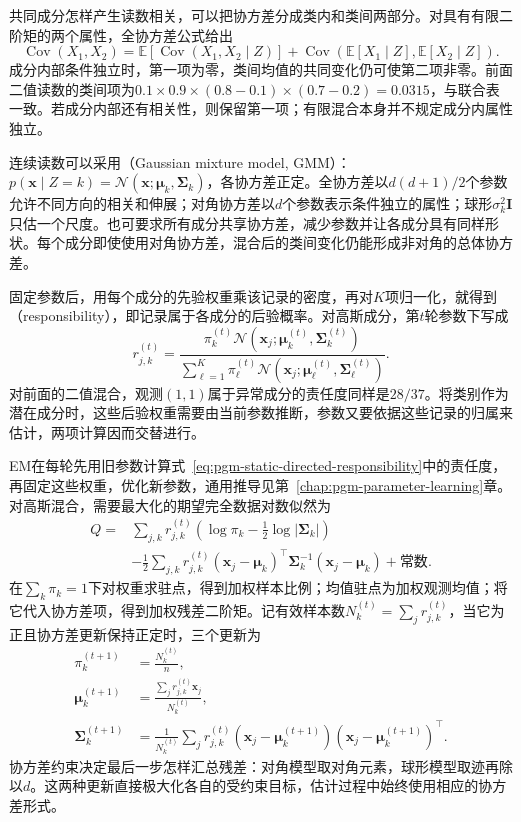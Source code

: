 共同成分怎样产生读数相关，可以把协方差分成类内和类间两部分。对具有有限二阶矩的两个属性，全协方差公式给出
\[
  \operatorname{Cov}(X_1,X_2)=
  \mathbb{E}\!\left[\operatorname{Cov}(X_1,X_2\mid Z)\right]
  +\operatorname{Cov}\!\left(
       \mathbb{E}[X_1\mid Z],\mathbb{E}[X_2\mid Z]\right).
\]
成分内部条件独立时，第一项为零，类间均值的共同变化仍可使第二项非零。前面二值读数的类间项为$0.1\times0.9\times(0.8-0.1)\times(0.7-0.2)=0.0315$，与联合表一致。若成分内部还有相关性，则保留第一项；有限混合本身并不规定成分内属性独立。

连续读数可以采用（Gaussian mixture model, GMM）：$p(\bm x\mid Z=k)=\mathcal N(\bm x;\bm\mu_k,\bm\Sigma_k)$，各协方差正定。全协方差以$d(d+1)/2$个参数允许不同方向的相关和伸展；对角协方差以$d$个参数表示条件独立的属性；球形$\sigma_k^2\bm I$只估一个尺度。也可要求所有成分共享协方差，减少参数并让各成分具有同样形状。每个成分即使使用对角协方差，混合后的类间变化仍能形成非对角的总体协方差。

固定参数后，用每个成分的先验权重乘该记录的密度，再对$K$项归一化，就得到（responsibility），即记录属于各成分的后验概率。对高斯成分，第$t$轮参数下写成
\begin{equation}
  \label{eq:pgm-static-directed-responsibility}
  r_{j,k}^{(t)}=
  \frac{\pi_k^{(t)}
      \mathcal{N}(\bm{x}_j;\bm{\mu}_k^{(t)},\bm{\Sigma}_k^{(t)})}
       {\sum_{\ell=1}^{K}\pi_\ell^{(t)}
      \mathcal{N}(\bm{x}_j;\bm{\mu}_\ell^{(t)},\bm{\Sigma}_\ell^{(t)})}.
\end{equation}
对前面的二值混合，观测$(1,1)$属于异常成分的责任度同样是$28/37$。将类别作为潜在成分时，这些后验权重需要由当前参数推断，参数又要依据这些记录的归属来估计，两项计算因而交替进行。

EM在每轮先用旧参数计算式~\eqref{eq:pgm-static-directed-responsibility}中的责任度，再固定这些权重，优化新参数，通用推导见第~\ref{chap:pgm-parameter-learning}章。对高斯混合，需要最大化的期望完全数据对数似然为
\[
  \begin{aligned}
    Q={}&\sum_{j,k}r_{j,k}^{(t)}
       \left(\log\pi_k-\frac12\log|\bm{\Sigma}_k|\right)\\
       &-\frac12\sum_{j,k}r_{j,k}^{(t)}
         (\bm{x}_j-\bm{\mu}_k)^\top
          \bm{\Sigma}_k^{-1}(\bm{x}_j-\bm{\mu}_k)
       +\text{常数}.
  \end{aligned}
\]
在$\sum_k\pi_k=1$下对权重求驻点，得到加权样本比例；均值驻点为加权观测均值；将它代入协方差项，得到加权残差二阶矩。记有效样本数$N_k^{(t)}=\sum_jr_{j,k}^{(t)}$，当它为正且协方差更新保持正定时，三个更新为
\begin{equation}
  \label{eq:pgm-static-directed-gmm-em}
  \begin{aligned}
    \pi_k^{(t+1)}&=\frac{N_k^{(t)}}{n},\\
    \bm{\mu}_k^{(t+1)}
      &=\frac{\sum_jr_{j,k}^{(t)}\bm{x}_j}{N_k^{(t)}},\\
    \bm{\Sigma}_k^{(t+1)}
      &=\frac{1}{N_k^{(t)}}\sum_jr_{j,k}^{(t)}
       (\bm{x}_j-\bm{\mu}_k^{(t+1)})
       (\bm{x}_j-\bm{\mu}_k^{(t+1)})^\top.
  \end{aligned}
\end{equation}
协方差约束决定最后一步怎样汇总残差：对角模型取对角元素，球形模型取迹再除以$d$。这两种更新直接极大化各自的受约束目标，估计过程中始终使用相应的协方差形式。

